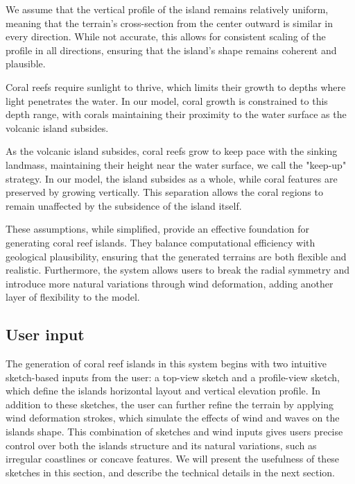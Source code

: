 \begin{Itemize}
     We assume that the vertical profile of the island remains relatively uniform, meaning that the terrain's cross-section from the center outward is similar in every direction. While not accurate, this allows for consistent scaling of the profile in all directions, ensuring that the island's shape remains coherent and plausible.

     Coral reefs require sunlight to thrive, which limits their growth to depths where light penetrates the water. In our model, coral growth is constrained to this depth range, with corals maintaining their proximity to the water surface as the volcanic island subsides.

     As the volcanic island subsides, coral reefs grow to keep pace with the sinking landmass, maintaining their height near the water surface, we call the "keep-up" strategy. In our model, the island subsides as a whole, while coral features are preserved by growing vertically. This separation allows the coral regions to remain unaffected by the subsidence of the island itself.
\end{Itemize}

These assumptions, while simplified, provide an effective foundation for generating coral reef islands. They balance computational efficiency with geological plausibility, ensuring that the generated terrains are both flexible and realistic. Furthermore, the system allows users to break the radial symmetry and introduce more natural variations through wind deformation, adding another layer of flexibility to the model.


\subsection{User input}

The generation of coral reef islands in this system begins with two intuitive sketch-based inputs from the user: a top-view sketch and a profile-view sketch, which define the islands horizontal layout and vertical elevation profile. In addition to these sketches, the user can further refine the terrain by applying wind deformation strokes, which simulate the effects of wind and waves on the islands shape. This combination of sketches and wind inputs gives users precise control over both the islands structure and its natural variations, such as irregular coastlines or concave features. We will present the usefulness of these sketches in this section, and describe the technical details in the next section.

